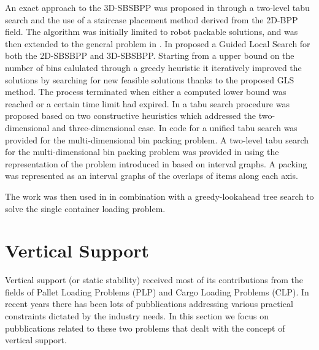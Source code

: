 An exact approach to the 3D-SBSBPP was proposed in \citep{martello2000three} through a two-level tabu search and the use of a staircase placement method derived from the 2D-BPP field.
The algorithm was initially limited to robot packable solutions, and was then extended to the general problem in \citep{martello2007exact}.
In \citep{faroe2003guided} proposed a Guided Local Search for both the 2D-SBSBPP and 3D-SBSBPP.
Starting from a upper bound on the number of bins calulated through a greedy heuristic it iteratively improved the solutions by searching for new feasible solutions thanks to the proposed GLS method.
The process terminated when either a computed lower bound was reached or a certain time limit had expired.
In \citep{lodi2002heuristic} a tabu search procedure was proposed based on two constructive heuristics which addressed the two-dimensional and three-dimensional case.
In \citep{Lodi2004} code for a unified tabu search was provided for the multi-dimensional bin packing problem.
A two-level tabu search for the multi-dimensional bin packing problem was provided in \citep{crainic2009ts2pack} using the representation of the problem introduced in \citep{fekete2004combinatorial} based on interval graphs. 
A packing was represented as an interval graphs of the overlaps of items along each axis.
\citep{parreno2010hybrid}

\citep{WU2010347}

\citep{ZHU2012452}
The work was then used in \citep{ZHU2012408} in combination with a greedy-lookahead tree search to solve the single container loading problem.

\citep{hifi2014hybrid}

\citep{gonccalves2013biased}

\citep{zudio2018brkga}

\section{Vertical Support}
\label{sec:literature:support}%
Vertical support (or static stability) received most of its contributions from the fields of Pallet Loading Problems (PLP) and Cargo Loading Problems (CLP).
In recent years there has been lots of pubblications addressing various practical constraints dictated by the industry needs.
In this section we focus on pubblications related to these two problems that dealt with the concept of vertical support.

